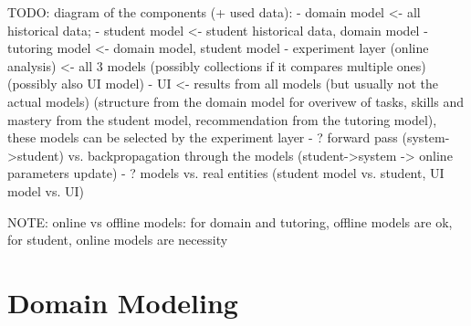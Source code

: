 TODO: diagram of the components (+ used data):
- domain model <- all historical data;
- student model <- student historical data, domain model
- tutoring model <- domain model, student model
- experiment layer (online analysis) <- all 3 models (possibly collections if it compares multiple ones) (possibly also UI model)
- UI <- results from all models (but usually not the actual models) (structure from the domain model for overivew of tasks, skills and mastery from the student model, recommendation from the tutoring model), these models can be selected by the experiment layer
- ? forward pass (system->student) vs. backpropagation through the models (student->system -> online parameters update)
- ? models vs. real entities (student model vs. student, UI model vs. UI)


NOTE: online vs offline models: for domain and tutoring, offline models are ok, for student, online models are necessity




\section{Domain Modeling}
\label{sec:domain-modeling}

